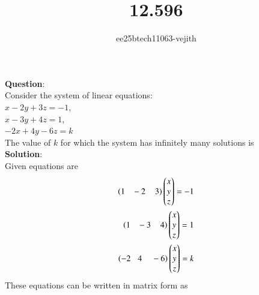 \documentclass[journal]{IEEEtran}
\begin{document}

\vspace{3cm}

\title{12.596}
\author{ee25btech11063-vejith}

\maketitle
{\let\newpage\relax\maketitle}
\renewcommand{\thefigure}{\theenumi}
\renewcommand{\thetable}{\theenumi}
\setlength{\intextsep}{10pt} %
\textbf{Question}:\\
Consider the system of linear equations:\\
\hspace*{6cm} $x-2y+3z=-1$,\\
\hspace*{6cm} $x-3y+4z= 1$,\\
\hspace*{6cm} $-2x+4y-6z= k$\\
The value of $k$ for which the system has infinitely many solutions is \underline{\hspace{2cm}} \hspace{5cm} \\
\textbf{Solution}:\\
Given equations are
\begin{align}
    \left(1 \hspace{0.3cm} -2 \hspace{0.4cm} 3\right)\begin{pmatrix}x\\y\\z\end{pmatrix}=-1\\
     \left(1 \hspace{0.3cm} -3 \hspace{0.4cm} 4\right)\begin{pmatrix}x\\y\\z\end{pmatrix}=1\\
      \left(-2 \hspace{0.3cm} 4 \hspace{0.4cm} -6\right)\begin{pmatrix}x\\y\\z\end{pmatrix}=k
\end{align}
These equations can be written in matrix form as
\end{document}

